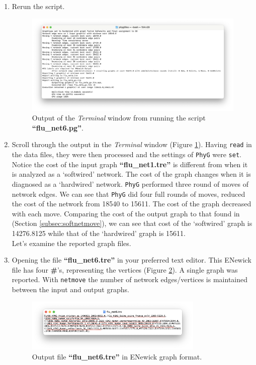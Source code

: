 \documentclass[11pt]{article}
\newcommand{\phyg}{\texttt{PhyG} }
\begin{document}
\begin {enumerate}
\item Rerun the script.

\begin{figure}
\centering
\includegraphics[width=\textwidth]{output5.png}
\caption{Output of the \textit{Terminal} window from running the script 
\textbf{``flu\_net6.pg''}.}
\label{output5}
\end{figure}

\item Scroll through the output in the \textit{Terminal} window (Figure \ref{output5}). 
Having \texttt{read} in the data files, they were then processed and the settings of 
\phyg were \texttt{set}. Notice the cost of the input graph \textbf{``flu\_net1.tre''} is 
different from when it is analyzed as a `softwired' network. The cost of the graph 
changes when it is diagnosed as a `hardwired' network. \phyg performed three 
round of moves of network edges. We can see that \phyg did four full rounds of 
moves, reduced the cost of the network from 18540 to 15611. The cost of the graph 
decreased with each move. Comparing the cost of the output graph to that found in 
(Section \ref{subsec:softnetmove}), we can see that cost of the `softwired' graph is 
14276.8125 while that of the `hardwired' graph is 15611.\\

Let's examine the reported graph files. 

\item Opening the file \textbf{``flu\_net6.tre''} in your preferred text editor. This 
ENewick file has four \textbf{\#}'s, representing the vertices (Figure \ref{tre6}). 
A single graph was reported. With \texttt{netmove} the number of network 
edges/vertices is maintained between the input and output graphs.

\begin{figure}[H]
\centering
\includegraphics[width=0.8\textwidth]{tre6.png}
\caption{Output file \textbf{``flu\_net6.tre''} in ENewick graph format.}
\label{tre6}
\end{figure}


\end{enumerate}
\end{document}
